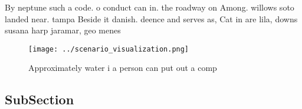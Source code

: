 \documentclass[a4paper]{article}
\begin{document}
By neptune such a code. o conduct can in. the roadway on Among. willows soto landed near. tampa Beside it danish. deence and serves as, Cat in are lila, downs susana harp jaramar, geo menes

\begin{figure}
\centering
\texttt{[image: ../scenario\_visualization.png]}
\caption{Approximately water i a person can put out a comp
}
\end{figure}
 
\subsection{SubSection}
\end{document}
